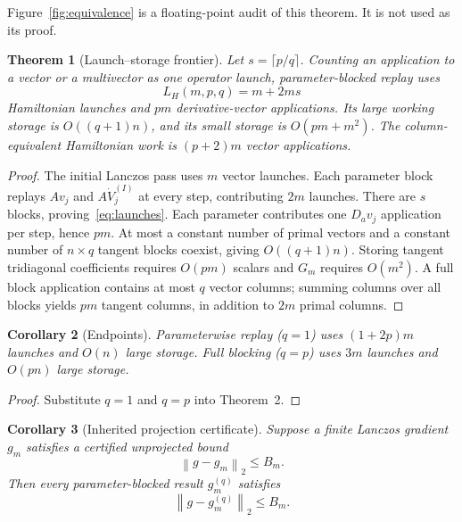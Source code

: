 \documentclass[10pt,letterpaper,twoside]{article}
\newtheorem{theorem}{Theorem}
\newtheorem{corollary}[theorem]{Corollary}
\newcommand{\norm}[1]{\left\lVert #1\right\rVert}
\begin{document}
Figure~\ref{fig:equivalence} is a floating-point audit of this theorem.  It is
not used as its proof.

\begin{theorem}[Launch--storage frontier]
Let $s=\lceil p/q\rceil$.  Counting an application to a vector or a
multivector as one operator launch, parameter-blocked replay uses
\begin{equation}
 L_H(m,p,q)=m+2ms
 \label{eq:launches}
\end{equation}
Hamiltonian launches and $pm$ derivative-vector applications.  Its large
working storage is $O((q+1)n)$, and its small storage is $O(pm+m^2)$.  The
column-equivalent Hamiltonian work is $(p+2)m$ vector applications.
\end{theorem}

\begin{proof}
The initial Lanczos pass uses $m$ vector launches.  Each parameter block
replays $Av_j$ and $A\dot V_j^{(I)}$ at every step, contributing $2m$ launches.
There are $s$ blocks, proving~\eqref{eq:launches}.  Each parameter contributes
one $D_av_j$ application per step, hence $pm$.  At most a constant number of
primal vectors and a constant number of $n\times q$ tangent blocks coexist,
giving $O((q+1)n)$.  Storing tangent tridiagonal coefficients requires
$O(pm)$ scalars and $G_m$ requires $O(m^2)$.  A full block application contains
at most $q$ vector columns; summing columns over all blocks yields $pm$ tangent
columns, in addition to $2m$ primal columns.
\end{proof}

\begin{corollary}[Endpoints]
Parameterwise replay ($q=1$) uses $(1+2p)m$ launches and $O(n)$ large storage.
Full blocking ($q=p$) uses $3m$ launches and $O(pn)$ large storage.
\end{corollary}

\begin{proof}
Substitute $q=1$ and $q=p$ into Theorem~2.
\end{proof}

\begin{corollary}[Inherited projection certificate]
Suppose a finite Lanczos gradient $g_m$ satisfies a certified unprojected
bound
\begin{equation}
 \norm{g-g_m}_2\leq B_m.
\end{equation}
Then every parameter-blocked result $g_m^{(q)}$ satisfies
\begin{equation}
 \norm{g-g_m^{(q)}}_2\leq B_m.
\end{equation}
\end{corollary}
\end{document}
